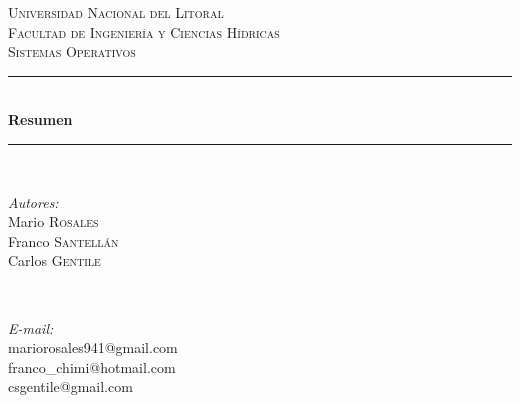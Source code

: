 \documentclass[10pt]{book}
\begin{document}
\begin{titlepage}
\newcommand{\HRule}{\rule{\linewidth}{0.5 mm}} %
\center %

\textsc{\huge Universidad Nacional del Litoral}\\[1 cm]
\textsc{\LARGE Facultad de Ingeniería y Ciencias Hídricas}\\[0.5 cm]
\textsc{\Large Sistemas Operativos}\\[2 cm]

\HRule \\[0.8 cm]
{ \huge \bfseries Resumen}\\[0.5 cm] %
\HRule \\[2 cm]
 
\begin{minipage}{0.4\textwidth}
\begin{flushleft} \large
\emph{Autores:}\\
Mario \textsc{Rosales}\\
Franco \textsc{Santellán}\\
Carlos \textsc{Gentile}\\
\end{flushleft}
\end{minipage}
~
\begin{minipage}{0.4\textwidth}
\begin{flushright} \large
\emph{E-mail:} \\
mariorosales941@gmail.com\\
franco\_chimi@hotmail.com\\
csgentile@gmail.com\\ %
\end{flushright}
\end{minipage}\\[2 cm]


\end{titlepage}
\end{document}
